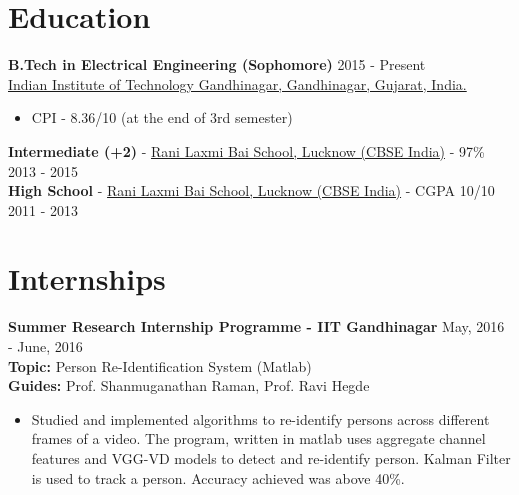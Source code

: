 \documentclass[margin, centered]{res}
\begin{document}
\begin{resume}

\section{Education}
\textbf{B.Tech in Electrical Engineering (Sophomore)} \hfill 2015 - Present
\\
\href{http://www.iitgn.ac.in/}{Indian Institute of Technology Gandhinagar, Gandhinagar, Gujarat, India.}
\begin{itemize}
\item CPI - 8.36/10 (at the end of 3rd semester)
\end{itemize}
\textbf{Intermediate (+2)} - \href{http://www.rlbschools.org/}{Rani Laxmi Bai School, Lucknow (CBSE India)} - 97\% \hfill 2013 - 2015
\\
\textbf{High School} - \href{http://www.rlbschools.org/}{Rani Laxmi Bai School, Lucknow (CBSE India)} - CGPA 10/10 \hfill 2011 - 2013


\section{Internships}
\textbf{Summer Research Internship Programme - IIT Gandhinagar} \hfill May, 2016 - June, 2016
\\
{\bf Topic: }Person Re-Identification System (Matlab)
\\
{\bf Guides: }Prof. Shanmuganathan Raman, Prof. Ravi Hegde
\vspace{1mm}
\begin{itemize}
\item Studied and implemented algorithms to re-identify persons across different frames of a video. The program, written in matlab uses aggregate channel features and VGG-VD models to detect and re-identify person. Kalman Filter is used to track a person. Accuracy achieved was above 40\%.
\end{itemize}


\end{resume}
\end{document}
